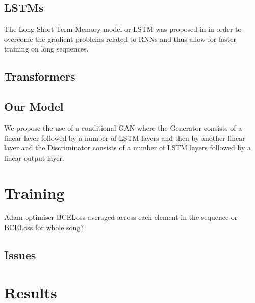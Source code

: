 \subsection{LSTMs}

The Long Short Term Memory model or LSTM was proposed in \cite{LSTMs} in order to overcome the gradient problems related to RNNs and thus allow for faster training on long sequences.

\subsection{Transformers}

\subsection{Our Model}

We propose the use of a conditional GAN where the Generator consists of a linear layer followed by a number of LSTM layers and then by another linear layer and the Discriminator consists of a number of LSTM layers followed by a linear output layer.

\section{Training}
Adam optimiser
BCELoss averaged across each element in the sequence or BCELoss for whole song?

\subsection{Issues}

\section{Results}
